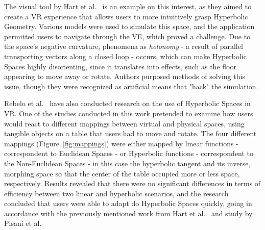 The visual tool by Hart et al.~\cite{Hart2017} is an example on this interest, as they aimed to create a \gls{VR} experience that allows users to 
more intuitively grasp Hyperbolic Geometry. Various models were used to simulate this space, and the application permitted users to navigate through 
the \gls{VE}, which proved a challenge. Due to the space's negative curvature, phenomena as \textit{holonomy} - 
a result of parallel transporting vectors along a closed loop - occurs, which can make Hyperbolic Spaces highly disorienting, 
since it translates into effects, such as the floor appearing to move away 
or rotate. Authors purposed methods of solving this issue, though they were recognized as artificial means that "hack" the simulation.

Rebelo et al.~\cite{Rebelo2022} have also conducted research on the use of Hyperbolic Spaces in \gls{VR}. One of the studies conducted in this work 
pretended to examine how users would react to different mappings between virtual and physical spaces, using tangible objects on a table that users 
had to move and rotate. The four different mappings (Figure~\ref{fig:mappings}) were either mapped by linear functions - correspondent to Euclidean Spaces - 
or Hyperbolic functions - correspondent to the Non-Euclidean Spaces - in this case the hyperbolic tangent and its inverse, morphing space so that 
the center of the table occupied more or less space, respectively. Results revealed that 
there were no significant differences in terms of efficiency between two linear and hyperbolic scenarios, and the research concluded that users 
were able to adapt do Hyperbolic Spaces quickly, going in accordance with the previously mentioned work from Hart et al.~\cite{Hart2017} and 
study by Pisani et al.~\cite{Pisani2019}

